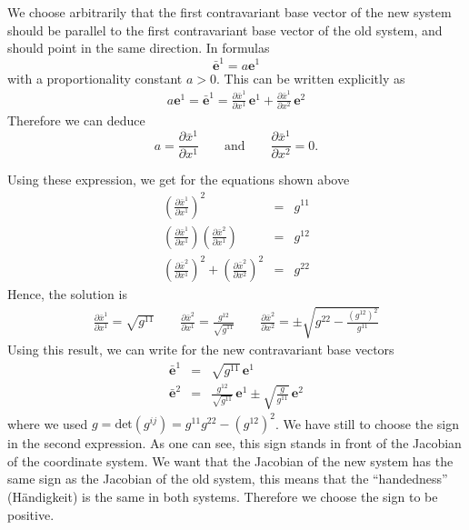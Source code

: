 We choose arbitrarily that the first contravariant base vector of the
new system should be parallel to the first contravariant base vector
of the old system, and should point in the same direction. In formulas
\begin{displaymath}
  \bar{\mathbf{e}}^1=a \mathbf{e}^1
\end{displaymath}
with a proportionality constant $a>0$.
This can be written explicitly as
\begin{eqnarray*}
  a\mathbf{e}^1 = \bar{\mathbf{e}}^1 = \frac{\partial\bar{x}^1}{\partial x^1}\,\mathbf{e}^1
  + \frac{\partial\bar{x}^1}{\partial x^2}\,\mathbf{e}^2
\end{eqnarray*}
Therefore we can deduce
\begin{displaymath}
  a=\frac{\partial\bar{x}^1}{\partial x^1}\qquad\mbox{and}\qquad 
  \frac{\partial\bar{x}^1}{\partial x^2}=0.
\end{displaymath}

Using these expression, we get for the equations shown above
\begin{eqnarray*}
  \left(
    \frac{\partial\bar x^1}{\partial x^1}
  \right)^2 &=& g^{11}\\
  \left(
    \frac{\partial\bar x^1}{\partial x^1}
  \right)\left(
    \frac{\partial\bar x^2}{\partial x^1}
  \right) &=& g^{12}\\
  \left(
    \frac{\partial\bar x^2}{\partial x^1}
  \right)^2
  +\left(
    \frac{\partial\bar x^2}{\partial x^2}
  \right)^2 &=& g^{22}
\end{eqnarray*}
Hence, the solution is 
\begin{eqnarray*}
  \frac{\partial\bar x^1}{\partial x^1} = \sqrt{g^{11}}\qquad
  \frac{\partial\bar x^2}{\partial x^1} = \frac{g^{12}}{\sqrt{g^{11}}}\qquad
  \frac{\partial\bar x^2}{\partial x^2}
  = \pm\sqrt{g^{22}-\frac{(g^{12})^2}{g^{11}}}
\end{eqnarray*}
Using this result, we can write for the new contravariant base vectors
\begin{eqnarray*}
  \bar{\mathbf{e}}^1&=&\sqrt{g^{11}}\,\mathbf{e}^1\\
  \bar{\mathbf{e}}^2&=&\frac{g^{12}}{\sqrt{g^{11}}}\,\mathbf{e}^1
  \pm\sqrt{\frac{g}{g^{11}}}\,\mathbf{e}^2
\end{eqnarray*}
where we used $g=\mbox{det}(g^{ij})=g^{11}g^{22}-(g^{12})^2$. We have
still to choose the sign in the second expression. As one can see,
this sign stands in front of the Jacobian of the coordinate system. We
want that the Jacobian of the new system has the same sign as the
Jacobian of the old system, this means that the ``handedness''
(H\"andigkeit) is the same in both systems. Therefore we choose the
sign to be positive.

